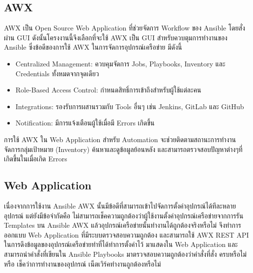 \subsection{AWX}
\hspace{0.5in} AWX เป็น Open Source Web Application ที่ช่วยจัดการ Workflow ของ Ansible โดยสั่งผ่าน GUI ดังนั้นโครงงานนี้จึงเลือกที่จะใช้ AWX เป็น GUI สำหรับควบตุมการทำงานของ Ansible ซึ่งข้อดีของการใช้ AWX ในการจัดการอุปกรณ์เครือข่าย มีดังนี้
\begin{itemize}
  \item Centralized Management: ควบคุมจัดการ Jobs, Playbooks, Inventory และ Credentials ทั้งหมดจากจุดเดียว
  \item Role-Based Access Control: กำหนดสิทธิ์การเข้าถึงสำหรับผู้ใช้แต่ละคน
  \item Integrations: รองรับการผสานรวมกับ Tools อื่นๆ เช่น Jenkins, GitLab และ GitHub
  \item Notification: มีการแจ้งเตือนผู้ใช้เมื่อมี Errors เกิดขึ้น
\end{itemize}
\hspace{0.5in} การใช้ AWX ใน Web Application สำหรับ Automation จะช่วยติดตามสถานะการทำงาน จัดการกลุ่มเป้าหมาย (Inventory) ค้นหาและดูข้อมูลย้อนหลัง และสามารถตรวจสอบปัญหาต่างๆที่เกิดขึ้นในเมื่อเกิด Errors

\subsection{Web Application}
\hspace{0.5in} เนื่องจากการใช้งาน Ansible AWX นั้นมีข้อดีที่สามารถเข้าไปจัดการตั้งค่าอุปกรณ์ได้ทีละหลายอุปกรณ์ แต่ยังมีข้อจำกัดคือ ไม่สามารถเช็คความถูกต้องว่าผู้ใช้งานตั้งค่าอุปกรณ์เครือข่ายจากการรัน Templates บน Ansible AWX แล้วอุปกรณ์เครือข่ายนั้นทำงานได้ถูกต้องจริงหรือไม่ จึงทำการออกแบบ Web Application ที่มีระบบตรวจสอบความถูกต้อง และสามารถใช้ AWX REST API ในการดึงข้อมูลของอุปกรณ์เครือข่ายทำที่ได้ทำการตั้งค่าไว้ มาแสดงใน Web Application และสามารถนำคำสั่งที่เขียนใน Ansible Playbooks มาตรวจสอบความถูกต้องว่าคำสั่งที่สั่ง ครบหรือไม่ หรือ เช็คว่าการทำงานของอุปกรณ์ เน็ตเวิร์คทำงานถูกต้องหรือไม่

